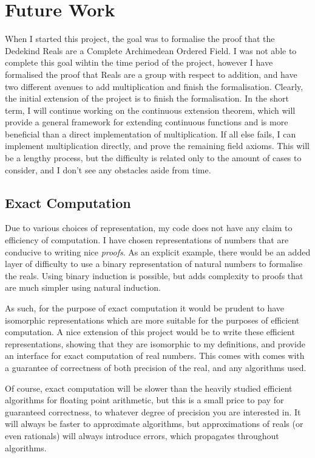 \documentclass[ProjectReport]{subfiles}
\begin{document}
\section{Future Work}

When I started this project, the goal was to formalise the proof that the Dedekind Reals are a Complete Archimedean Ordered Field. I was not able to complete this goal wihtin the time period of the project, however I have formalised the proof that Reals are a group with respect to addition, and have two different avenues to add multiplication and finish the formalisation. Clearly, the initial extension of the project is to finish the formalisation. In the short term, I will continue working on the continuous extension theorem, which will provide a general framework for extending continuous functions and is more beneficial than a direct implementation of multiplication. If all else fails, I can implement multiplication directly, and prove the remaining field axioms. This will be a lengthy process, but the difficulty is related only to the amount of cases to consider, and I don't see any obstacles aside from time.

\subsection{Exact Computation}

Due to various choices of representation, my code does not have any claim to efficiency of computation. I have chosen representations of numbers that are conducive to writing nice \textit{proofs}. As an explicit example, there would be an added layer of difficulty to use a binary representation of natural numbers to formalise the reals. Using binary induction is possible, but adds complexity to proofs that are much simpler using natural induction. 

As such, for the purpose of exact computation it would be prudent to have isomorphic representations which are more suitable for the purposes of efficient computation. A nice extension of this project would be to write these efficient representations, showing that they are isomorphic to my definitions, and provide an interface for exact computation of real numbers. This comes with comes with a guarantee of correctness of both precision of the real, and any algorithms used.

Of course, exact computation will be slower than the heavily studied efficient algorithms for floating point arithmetic, but this is a small price to pay for guaranteed correctness, to whatever degree of precision you are interested in. 
It will always be faster to approximate algorithms, but approximations of reals (or even rationals) will always introduce errors, which propagates throughout algorithms. 

\end{document}
